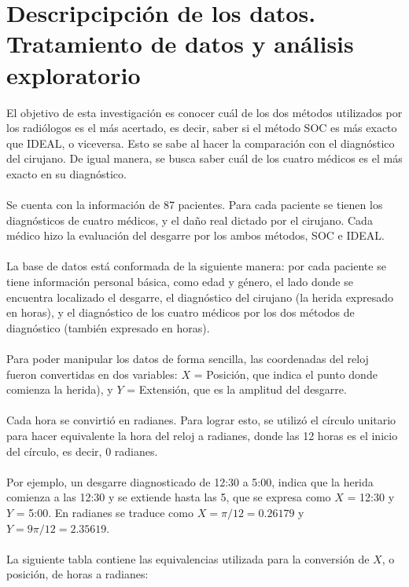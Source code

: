 \documentclass{article}
\begin{document}
\section{Descripcipción de los datos. Tratamiento de datos y análisis exploratorio}
	
	El objetivo de esta investigación es conocer cuál de los dos métodos utilizados por los radiólogos es el más acertado, es decir, saber si el método SOC es más exacto que IDEAL, o viceversa. Esto se sabe al hacer la comparación con el diagnóstico del cirujano. De igual manera, se busca saber cuál de los cuatro médicos es el más exacto en su diagnóstico.
	 \ \\ \ \\
	Se cuenta con la información de 87 pacientes. Para cada paciente se tienen los diagnósticos de cuatro médicos, y el daño real dictado por el cirujano. Cada médico hizo la evaluación del desgarre por los ambos métodos, SOC e IDEAL.
	 \ \\ \ \\
	La base de datos está conformada de la siguiente manera: por cada paciente se tiene información personal básica, como edad y género, el lado donde se encuentra localizado el desgarre, el diagnóstico del cirujano (la herida expresado en horas), y el diagnóstico de los cuatro médicos por los dos métodos de diagnóstico (también expresado en horas).
	\ \\ \ \\
	Para poder manipular los datos de forma sencilla, las coordenadas del reloj fueron convertidas en dos variables: $X$ = Posición, que indica el punto donde comienza la herida), y $Y$ = Extensión, que es la amplitud del desgarre. 
	\ \\ \ \\
	Cada hora se convirtió en radianes. Para lograr esto, se utilizó el círculo unitario para hacer equivalente la hora del reloj a radianes, donde las 12 horas es el inicio del círculo, es decir, 0 radianes.
	\ \\ \ \\	
	Por ejemplo, un desgarre diagnosticado de 12:30 a 5:00, indica que la herida comienza a las 12:30 y se extiende hasta las 5, que se expresa como $X$ = 12:30 y $Y$ = 5:00. En radianes se traduce como $X = \pi /12 = 0.26179$ y\ $Y = 9 \pi /12 = 2.35619$. 
	\ \\ \ \\
	La siguiente tabla contiene las equivalencias utilizada para la conversión de $X$, o posición, de horas a radianes:
\end{document}
